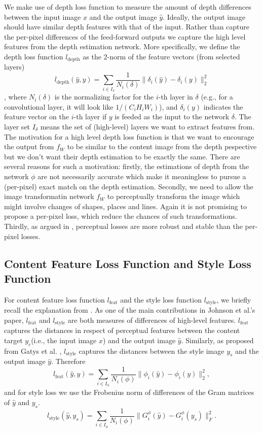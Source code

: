 \documentclass[10pt,twocolumn,letterpaper]{article}
\begin{document}
We make use of depth loss function to measure the amount of depth differences between the input image $x$ and the output image $\hat y$. Ideally, the output image should have similar depth features with that of the input. Rather than capture the per-pixel differences of the feed-forward outputs we capture the high level features from the depth estimation network. More specifically, we define the depth loss function $l_\text{depth}$ as the 2-norm of the feature vectors (from selected layers) \[l_\text{depth}(\hat y, y) = \sum_{i \in I_\delta} \frac{1}{N_i (\delta)}\|\delta_i(\hat y) - \delta_i(y)\|_2^2\], where $N_i(\delta)$ is the normalizing factor for the $i$-th layer in $\delta$ (e.g., for a convolutional layer, it will look like $1/(C_i H_i W_i)$), and $\delta_i(y)$ indicates the feature vector on the $i$-th layer if $y$ is feeded as the input to the network $\delta$. The layer set $I_\delta$ means the set of (high-level) layers we want to extract features from. The motivation for a high level depth loss function is that we want to encourage the output from $f_W$ to be similar to the content image from the depth pespective but we don't want their depth estimation to be exactly the same. There are several reasons for such a motivation: firstly, the estimations of depth from the network $\phi$ are not necessarily accurate which make it meaningless to pursue a (per-pixel) exact match on the depth estimation. Secondly, we need to allow the image transformatin network $f_W$ to perceptually transform the image which might involve changes of shapes, places and lines. Again it is not promising to propose a per-pixel loss, which reduce the chances of such transformations. Thirdly, as argued in \cite{johnson2016perceptual}, perceptual losses are more robust and stable than the per-pixel losses.

\subsection{Content Feature Loss Function and Style Loss Function}
For content feature loss function $l_\text{feat}$ and the style loss function $l_\text{style}$, we briefly recall the explanation from \cite{johnson2016perceptual}. As one of the main contributions in Johnson et al.'s paper, $l_\text{feat}$ and $l_\text{style}$ are both measures of differences of high-level features. $l_\text{feat}$ captures the distances in respect of perceptual features between the content target $y_c$(i.e., the input image $x$) and the output image $\hat y$. Similarly, as proposed from Gatys et al. \cite{gatys2016image}, $l_\text{style}$ captures the distances between the style image $y_s$ and the output image $\hat y$. 
Therefore
\[ l_\text{feat}(\hat y, y) = \sum_{i \in I_\phi} \frac{1}{N_i(\phi)}\|\phi_i(\hat y) - \phi_i(y)\|_2^2, \]
and for style loss we use the Frobenius norm of differences of the Gram matrices of $\hat y$ and $y_s$.
\[ l_\text{style}(\hat y, y_s) = \sum_{i \in I_\phi} \frac{1}{N_i(\phi)}\|G^\phi_i(\hat y) - G^\phi_i(y_s)\|_F^2. \]
\end{document}
